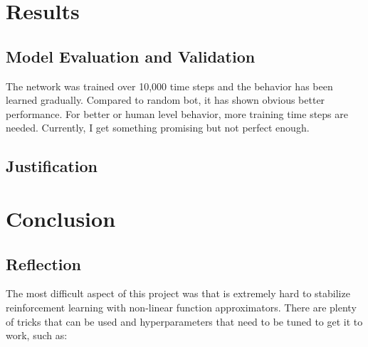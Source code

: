 \documentclass[a4paper]{article}
\begin{document}
\section{Results}

\subsection{Model Evaluation and Validation}

The network was trained over 10,000 time steps and the behavior has been learned gradually. Compared to random bot, it has shown obvious better performance. For better or human level behavior, more training time steps are needed. Currently, I get something promising but not perfect enough.

\subsection{Justification}



\section{Conclusion}

\subsection{Reflection}
The most difficult aspect of this project was that is extremely hard to stabilize reinforcement learning with non-linear function approximators. There are plenty of tricks that can be used and hyperparameters that need to be tuned to get it to work, such as:
\end{document}
